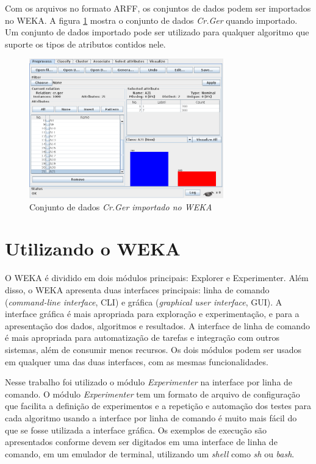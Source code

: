 Com os arquivos no formato ARFF, os conjuntos de dados podem ser importados no WEKA. A figura \ref{fig:dev_weka_arff} mostra o conjunto de dados \emph{Cr.Ger} quando importado. Um conjunto de dados importado pode ser utilizado para qualquer algoritmo que suporte os tipos de atributos contidos nele.

\begin{figure}[h!]
    \vspace{0.5cm}
    \centering
    \caption{Conjunto de dados \emph{Cr.Ger importado no WEKA}}
    \label{fig:dev_weka_arff}
    \vspace{0.5cm}
    \includegraphics[width=0.75\textwidth]{img/cr_ger.png}
    \vspace{0.5cm}
    \vspace{0.5cm}
\end{figure}

\section{Utilizando o WEKA}

O WEKA é dividido em dois módulos principais: Explorer e Experimenter. Além disso, o WEKA apresenta duas interfaces principais: linha de comando (\emph{command-line interface}, CLI) e gráfica (\emph{graphical user interface}, GUI). A interface gráfica é mais apropriada para exploração e experimentação, e para a apresentação dos dados, algoritmos e resultados. A interface de linha de comando é mais apropriada para automatização de tarefas e integração com outros sistemas, além de consumir menos recursos. Os dois módulos podem ser usados em qualquer uma das duas interfaces, com as mesmas funcionalidades.

Nesse trabalho foi utilizado o módulo \emph{Experimenter} na interface por linha de comando. O módulo \emph{Experimenter} tem um formato de arquivo de configuração que facilita a definição de experimentos e a repetição e automação dos testes para cada algoritmo usando a interface por linha de comando é muito mais fácil do que se fosse utilizada a interface gráfica. Os exemplos de execução são apresentados conforme devem ser digitados em uma interface de linha de comando, em um emulador de terminal, utilizando um \emph{shell} como \emph{sh} ou \emph{bash}.

